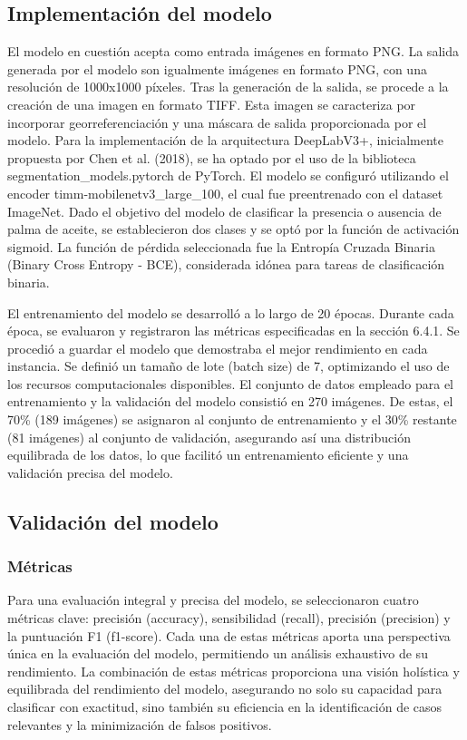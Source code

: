 \subsection{Implementación del modelo}
El modelo en cuestión acepta como entrada imágenes en formato PNG. La salida generada por el modelo son igualmente imágenes en formato PNG, con una resolución de 1000x1000 píxeles. Tras la generación de la salida, se procede a la creación de una imagen en formato TIFF. Esta imagen se caracteriza por incorporar georreferenciación y una máscara de salida proporcionada por el modelo. Para la implementación de la arquitectura DeepLabV3+, inicialmente propuesta por Chen et al. (2018), se ha optado por el uso de la biblioteca segmentation\_models.pytorch de PyTorch. El modelo se configuró utilizando el encoder timm-mobilenetv3\_large\_100, el cual fue preentrenado con el dataset ImageNet. Dado el objetivo del modelo de clasificar la presencia o ausencia de palma de aceite, se establecieron dos clases y se optó por la función de activación sigmoid. La función de pérdida seleccionada fue la Entropía Cruzada Binaria (Binary Cross Entropy - BCE), considerada idónea para tareas de clasificación binaria.

El entrenamiento del modelo se desarrolló a lo largo de 20 épocas. Durante cada época, se evaluaron y registraron las métricas especificadas en la sección 6.4.1. Se procedió a guardar el modelo que demostraba el mejor rendimiento en cada instancia. Se definió un tamaño de lote (batch size) de 7, optimizando el uso de los recursos computacionales disponibles. El conjunto de datos empleado para el entrenamiento y la validación del modelo consistió en 270 imágenes. De estas, el 70\% (189 imágenes) se asignaron al conjunto de entrenamiento y el 30\% restante (81 imágenes) al conjunto de validación, asegurando así una distribución equilibrada de los datos, lo que facilitó un entrenamiento eficiente y una validación precisa del modelo.

\subsection{Validación del modelo}

\subsubsection{Métricas}
Para una evaluación integral y precisa del modelo, se seleccionaron cuatro métricas clave: precisión (accuracy), sensibilidad (recall), precisión (precision) y la puntuación F1 (f1-score). Cada una de estas métricas aporta una perspectiva única en la evaluación del modelo, permitiendo un análisis exhaustivo de su rendimiento. La combinación de estas métricas proporciona una visión holística y equilibrada del rendimiento del modelo, asegurando no solo su capacidad para clasificar con exactitud, sino también su eficiencia en la identificación de casos relevantes y la minimización de falsos positivos.

